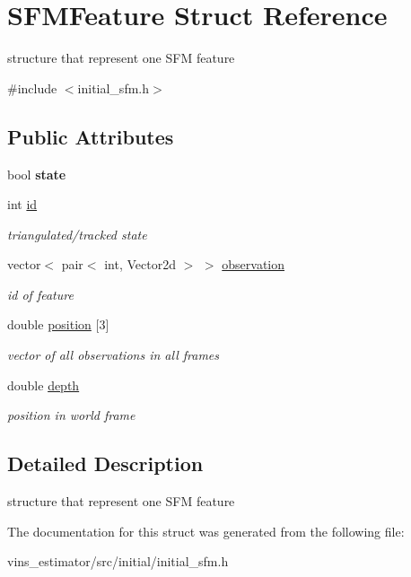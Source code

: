 \hypertarget{structSFMFeature}{}\section{S\+F\+M\+Feature Struct Reference}
\label{structSFMFeature}


structure that represent one S\+FM feature  




{\ttfamily \#include $<$initial\+\_\+sfm.\+h$>$}

\subsection*{Public Attributes}
\begin{DoxyCompactItemize}
\item 
\mbox{\label{structSFMFeature_a0370327d1f7e103db17278654bb59ffc}} 
bool {\bfseries state}
\item 
\mbox{\label{structSFMFeature_adddcbbd8ac3d048225a87ecfe8a1330d}} 
int \hyperlink{structSFMFeature_adddcbbd8ac3d048225a87ecfe8a1330d}{id}
\begin{DoxyCompactList}\small\item\em triangulated/tracked state \end{DoxyCompactList}\item 
\mbox{\label{structSFMFeature_a1a8649139ced058fdf0fc4e461c0c39e}} 
vector$<$ pair$<$ int, Vector2d $>$ $>$ \hyperlink{structSFMFeature_a1a8649139ced058fdf0fc4e461c0c39e}{observation}
\begin{DoxyCompactList}\small\item\em id of feature \end{DoxyCompactList}\item 
\mbox{\label{structSFMFeature_a4b6e5a2e9e29b702656adbb4c56531bf}} 
double \hyperlink{structSFMFeature_a4b6e5a2e9e29b702656adbb4c56531bf}{position} \mbox{[}3\mbox{]}
\begin{DoxyCompactList}\small\item\em vector of all observations in all frames \end{DoxyCompactList}\item 
\mbox{\label{structSFMFeature_a06b7030acd6e525896e0fdb8efa27394}} 
double \hyperlink{structSFMFeature_a06b7030acd6e525896e0fdb8efa27394}{depth}
\begin{DoxyCompactList}\small\item\em position in world frame \end{DoxyCompactList}\end{DoxyCompactItemize}


\subsection{Detailed Description}
structure that represent one S\+FM feature 

The documentation for this struct was generated from the following file\+:\begin{DoxyCompactItemize}
\item 
vins\+\_\+estimator/src/initial/initial\+\_\+sfm.\+h\end{DoxyCompactItemize}
